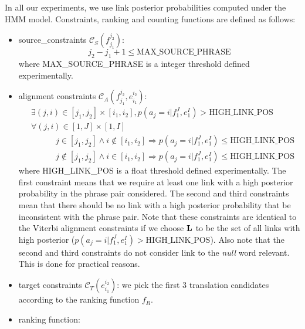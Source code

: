 %
In all our experiments, we use link posterior probabilities computed under the
HMM model.
%
%
Constraints, ranking and counting functions are defined as follows:
%
\begin{itemize}
  \item source\_constraints $\mathcal{C}_S(f_{j_1}^{j_2})$:
%
\begin{equation}
  j_2 - j_1 + 1 \leq \mbox{MAX\_SOURCE\_PHRASE}
\end{equation}
%
where MAX\_SOURCE\_PHRASE is a integer threshold defined experimentally.
  \item alignment constraints $\mathcal{C}_A(f_{j_1}^{j_2}, e_{i_1}^{i_2})$:
%
\begin{equation}
  \begin{split}
    & \exists (j,i) \in [j_1,j_2] \times [i_1,i_2], p(a_j = i|f_1^J,e_1^I) > \mbox{HIGH\_LINK\_POS} \\
    & \forall (j,i) \in [1, J] \times [1, I] \\
    & \hspace{3em} j \in [j_1,j_2] \wedge i \not\in [i_1,i_2] \Rightarrow p(a_j = i | f_1^J,e_1^I) \leq \mbox{HIGH\_LINK\_POS} \\
    & \hspace{3em} j \not\in [j_1,j_2] \wedge i \in [i_1,i_2] \Rightarrow p(a_j = i | f_1^J,e_1^I) \leq \mbox{HIGH\_LINK\_POS}
  \end{split}
\end{equation}
%
where HIGH\_LINK\_POS is a float threshold defined experimentally.
The first constraint means that we require at least one link with a
high posterior probability in the phrase pair considered. The second and third
constraints mean that there should be no link with a high posterior probability
that be inconsistent with the phrase pair. Note that these constraints are
identical to the Viterbi alignment constraints if we choose ${\bf L}$ to be the
set of all links with high posterior
($p(a_j = i|f_1^J,e_1^I) > \mbox{HIGH\_LINK\_POS}$). Also note that the second
and third constraints do not consider link to the \emph{null} word relevant.
This is done for practical reasons.
  \item target constraints $\mathcal{C}_T(e_{i_1}^{i_2})$: we pick the first 3
translation candidates according to the ranking function $f_R$.
  \item ranking function:

\end{itemize}
